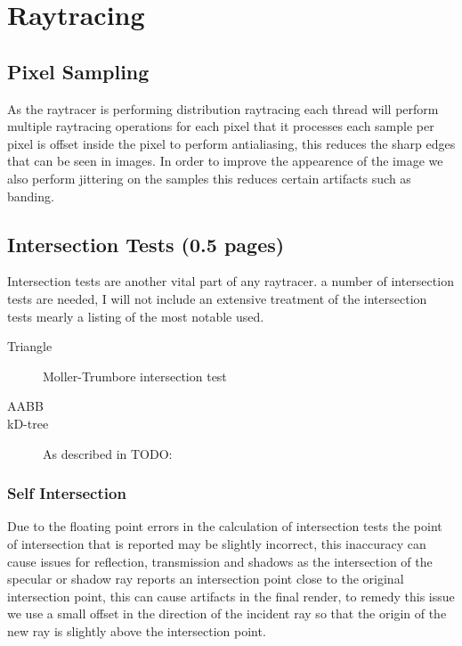 \section{Raytracing}
\subsection{Pixel Sampling}
As the raytracer is performing distribution raytracing each thread will perform multiple raytracing operations for each pixel
that it processes each sample per pixel is offset inside the pixel to perform antialiasing, this reduces the sharp edges that
can be seen in images. In order to improve the appearence of the image we also perform jittering on the samples this reduces
certain artifacts such as banding. 


\subsection{Intersection Tests (0.5 pages)}

Intersection tests are another vital part of any raytracer. a number of intersection tests are needed, I will not include
an extensive treatment of the intersection tests mearly a listing of the most notable used.

\begin{description}
\item[Triangle] Moller-Trumbore intersection test \cite{MolTru97}
\item[AABB]
\item[kD-tree] As described in TODO:
\end{description}

\subsubsection{Self Intersection}
Due to the floating point errors in the calculation of intersection tests the point of intersection that is reported may be
slightly incorrect, this inaccuracy can cause issues for reflection, transmission and shadows as the intersection of the
specular or shadow ray reports an intersection point close to the original intersection point, this can cause artifacts in
the final render, to remedy this issue we use a small offset in the direction of the incident ray so that the origin of the
new ray is slightly above the intersection point.

